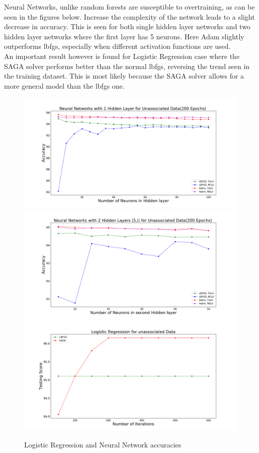 Neural Networks, unlike random forests are susceptible to overtraining, as can be seen in the figures below. Increase the complexity of the network leads to a slight decrease in accuracy. This is seen for both single hidden layer networks and two hidden layer networks where the first layer has 5 neurons. Here Adam slightly outperforms lbfgs, especially when different activation functions are used. \\
An important result however is found for Logistic Regression case where the SAGA solver performs better than the normal lbfgs, reversing the trend seen in the training dataset. This is most likely because the SAGA solver allows for a more general model than the lbfgs one.\\
\begin{figure}[h]
\includegraphics[width=\twopicsp\textwidth]{plots/neurons4.pdf}
\includegraphics[width=\twopicsp\textwidth]{plots/neurons5.pdf}
\includegraphics[width=\twopicsp\textwidth]{plots/solver_unass.pdf}
\caption{Logistic Regression and Neural Network accuracies}
\label{fig:Maps_data}
\end{figure}


